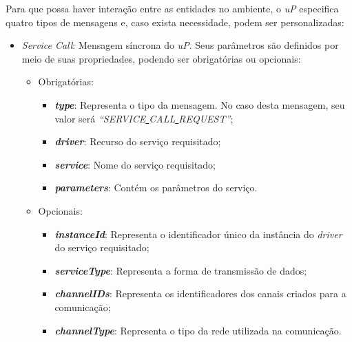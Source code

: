 Para que possa haver interação entre as entidades no ambiente, o \emph{uP} especifica quatro tipos de mensagens e, caso exista necessidade,  podem ser personalizadas:

\begin{itemize}
	\item \emph{Service Call}: Mensagem síncrona do \emph{uP}. Seus parâmetros são definidos por meio de suas propriedades, podendo ser obrigatórias ou opcionais:
		\begin{itemize}
			\item Obrigatórias:
				\begin{itemize}
					\item \emph{\bf{type}}: Representa o tipo da mensagem. No caso desta mensagem, seu valor será \emph{``SERVICE\underline{ }CALL\underline{ }REQUEST''};
					\item \emph{\bf{driver}}: Recurso do serviço requisitado;
					\item \emph{\bf{service}}: Nome do serviço requisitado;
					\item \emph{\bf{parameters}}: Contém os parâmetros do serviço.
				\end{itemize}
			\item Opcionais:
				\begin{itemize}
					\item \emph{\bf{instanceId}}: Representa o identificador único da instância do \emph{driver} do serviço requisitado;
					\item \emph{\bf{serviceType}}: Representa a forma de transmissão de dados;
					\item \emph{\bf{channelIDs}}: Representa os identificadores dos canais criados para a comunicação;
					\item \emph{\bf{channelType}}: Representa o tipo da rede utilizada na comunicação.
				\end{itemize}
		\end{itemize}
\end{itemize}
